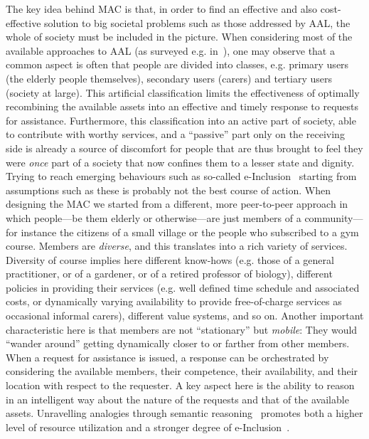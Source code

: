 \documentclass{llncs}
\begin{document}
The key idea behind MAC is that, in order to find an effective and also
cost-effective solution to big societal problems such as those addressed by AAL, the whole of society
must be included in the picture. When considering most of the available approaches to AAL (as surveyed e.g.
in~\cite{SDGB09a}), one may observe that a common aspect is often that people are divided into classes,
e.g. primary users (the elderly
people themselves), secondary users (carers) and tertiary users (society at large). This artificial
classification limits the effectiveness of optimally recombining the available assets into an effective
and timely response to requests for assistance. Furthermore, this classification into an active part of
society, able to contribute with worthy services, and a ``passive'' part only on the receiving side is
already a source of discomfort for people that are thus brought to feel they were \emph{once\/}
part of a society that now confines them to
a lesser state and dignity. Trying to reach emerging behaviours such as so-called e-Inclusion~\cite{eInc}
starting from
assumptions such as these is probably not the best course of action. When designing the MAC we
started from a different, more peer-to-peer approach in which people---be them elderly or otherwise---are
just members of a community---for instance the citizens of a small village or the people who subscribed
to a gym course. Members are \emph{diverse}, and this translates into a rich variety of services.
Diversity of course implies here different know-hows (e.g. those of a general practitioner, or of a
gardener, or of a retired professor of biology), different policies in providing their services (e.g.
well defined time schedule and associated costs, or dynamically varying availability to provide
free-of-charge services as occasional informal carers), different value systems, and so on. Another important characteristic here
is that members are not ``stationary'' but \emph{mobile}: They would ``wander around'' getting
dynamically closer to or farther from other members. When a request for assistance is issued, a response
can be orchestrated by considering the available members, their competence, their availability, and their
location with respect to the requester. A key aspect here is the ability to reason in an intelligent way
about the nature of the requests and that of the available assets. Unravelling analogies through semantic
reasoning~\cite{BPGR08} promotes both a higher level of resource utilization and a stronger degree of
e-Inclusion~\cite{SDGB07a}.
\end{document}

